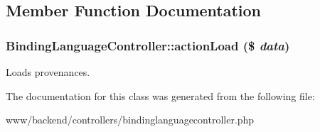 \subsection{Member Function Documentation}
\hypertarget{classBindingLanguageController_a564b6c76c76dc61fb02a5a9e25d0e8c7}{
\subsubsection[{actionLoad}]{\setlength{\rightskip}{0pt plus 5cm}BindingLanguageController::actionLoad (\$ {\em data})}}
\label{classBindingLanguageController_a564b6c76c76dc61fb02a5a9e25d0e8c7}
Loads provenances. 

The documentation for this class was generated from the following file:\begin{DoxyCompactItemize}
\item 
www/backend/controllers/bindinglanguagecontroller.php\end{DoxyCompactItemize}

